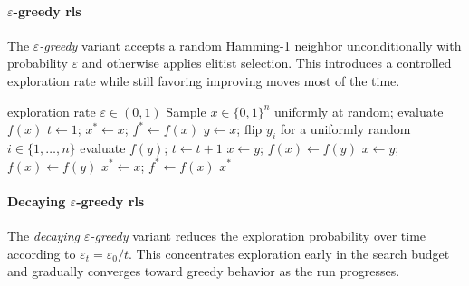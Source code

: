 \paragraph[\texorpdfstring{$\varepsilon$-greedy RLS}{epsilon-greedy
RLS}]{$\varepsilon$-greedy \acrshort{rls}}

The \textit{$\varepsilon$-greedy} variant accepts a random Hamming-1
neighbor unconditionally with probability $\varepsilon$ and otherwise
applies elitist selection. This introduces a controlled exploration
rate while still favoring improving moves most of the time.

\begin{algorithm}[H]
  \caption{$\varepsilon$-Greedy RLS}
  \label{alg:rls-eps}
  \begin{algorithmic}[1]
    \Require exploration rate $\varepsilon \in (0,1)$
    \State Sample $x \in \{0,1\}^n$ uniformly at random; evaluate $f(x)$
    \State $t \gets 1$;\; $x^{*} \gets x$;\; $f^{*} \gets f(x)$
    \Repeat
    \State $y \gets x$;\; flip $y_i$ for a uniformly random $i \in
    \{1,\ldots,n\}$
    \State evaluate $f(y)$;\; $t \gets t + 1$
    \State $x \gets y$;\; $f(x) \gets f(y)$ 
    \State $x \gets y$;\; $f(x) \gets f(y)$ 
    \EndIf
     $x^{*} \gets x$;\; $f^{*} \gets f(x)$ \EndIf
    \State \Return $x^{*}$
  \end{algorithmic}
\end{algorithm}

\paragraph[\texorpdfstring{Decaying $\varepsilon$-greedy RLS}{Decaying
epsilon-greedy RLS}]{Decaying $\varepsilon$-greedy \acrshort{rls}}

The \textit{decaying $\varepsilon$-greedy} variant reduces the
exploration probability over time according to
$\varepsilon_t = \varepsilon_0 / t$. This concentrates exploration
early in the search budget and gradually converges toward greedy
behavior as the run progresses.

